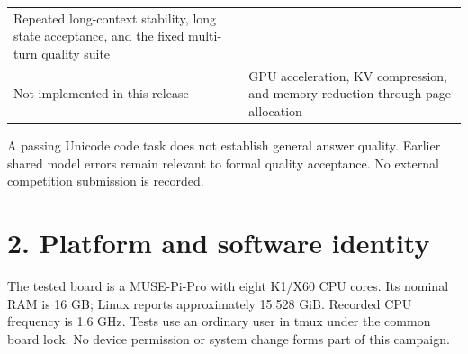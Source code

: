 \documentclass[10pt,a4paper]{article}
\begin{document}
\begin{longtable}[]{@{}ll@{}}
\begin{minipage}[t]{0.47\columnwidth}
Repeated long-context stability, long state acceptance, and the fixed
multi-turn quality suite\strut
\end{minipage}\tabularnewline
\begin{minipage}[t]{0.47\columnwidth}\raggedright
Not implemented in this release\strut
\end{minipage} & \begin{minipage}[t]{0.47\columnwidth}\raggedright
GPU acceleration, KV compression, and memory reduction through page
allocation\strut
\end{minipage}\tabularnewline
\bottomrule
\end{longtable}

A passing Unicode code task does not establish general answer quality.
Earlier shared model errors remain relevant to formal quality
acceptance. No external competition submission is recorded.

\hypertarget{platform-and-software-identity}{%
\section{2. Platform and software
identity}\label{platform-and-software-identity}}

The tested board is a MUSE-Pi-Pro with eight K1/X60 CPU cores. Its
nominal RAM is 16 GB; Linux reports approximately 15.528 GiB. Recorded
CPU frequency is 1.6 GHz. Tests use an ordinary user in tmux under the
common board lock. No device permission or system change forms part of
this campaign.
\end{document}
